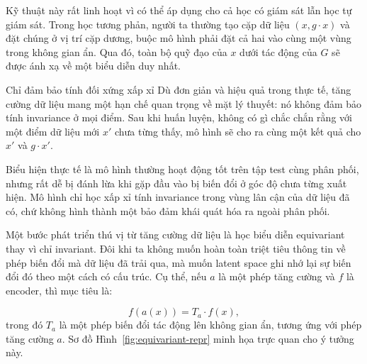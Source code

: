 Kỹ thuật này rất linh hoạt vì có thể áp dụng cho cả học có giám sát lẫn học tự giám sát. Trong học tương phản, người ta thường tạo cặp dữ liệu $(x, g \cdot x)$ và đặt chúng ở vị trí cặp dương, buộc mô hình phải đặt cả hai vào cùng một vùng trong không gian ẩn. Qua đó, toàn bộ quỹ đạo của $x$ dưới tác động của $G$ sẽ được ánh xạ về một biểu diễn duy nhất.

\begin{warningbox}{Chỉ đảm bảo tính đối xứng xấp xỉ}
Dù đơn giản và hiệu quả trong thực tế, tăng cường dữ liệu mang một hạn chế quan trọng về mặt lý thuyết: nó không đảm bảo tính invariance ở mọi điểm. Sau khi huấn luyện, không có gì chắc chắn rằng với một điểm dữ liệu mới $x'$ chưa từng thấy, mô hình sẽ cho ra cùng một kết quả cho $x'$ và $g \cdot x'$. 

Biểu hiện thực tế là mô hình thường hoạt động tốt trên tập test cùng phân phối, nhưng rất dễ bị đánh lừa khi gặp đầu vào bị biến đổi ở góc độ chưa từng xuất hiện. Mô hình chỉ học xấp xỉ tính invariance trong vùng lân cận của dữ liệu đã có, chứ không hình thành một bảo đảm khái quát hóa ra ngoài phân phối.
\end{warningbox}

\begin{morong}
Một bước phát triển thú vị từ tăng cường dữ liệu là học biểu diễn equivariant thay vì chỉ invariant. Đôi khi ta không muốn hoàn toàn triệt tiêu thông tin về phép biến đổi mà dữ liệu đã trải qua, mà muốn latent space ghi nhớ lại sự biến đổi đó theo một cách có cấu trúc. Cụ thể, nếu $a$ là một phép tăng cường và $f$ là encoder, thì mục tiêu là:

\begin{equation}
    f(a(x)) = T_a \cdot f(x),
\end{equation}
trong đó $T_a$ là một phép biến đổi tác động lên không gian ẩn, tương ứng với phép tăng cường $a$. Sơ đồ Hình~\ref{fig:equivariant-repr} minh họa trực quan cho ý tưởng này.
\end{morong}

